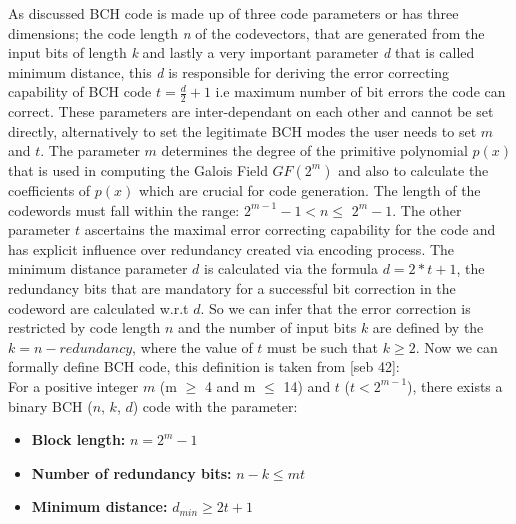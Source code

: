 As discussed BCH code is made up of three code parameters or has three dimensions; the code length \emph{n} of the codevectors, that are generated from the input bits of length \emph{k} and lastly a very important parameter \emph{d} that is called minimum distance, this \emph{d} is responsible for deriving the error correcting capability of BCH code $t = \frac{d}{2} + 1$ i.e maximum number of bit errors the code can correct. These parameters are inter-dependant on each other
and cannot be set directly, alternatively to set the legitimate BCH modes the user needs to set $m$ and $t$. The parameter $m$ determines the degree of the primitive polynomial $p(x)$ that is used in computing the Galois Field $GF(2^m)$ and also to calculate the coefficients of $p(x)$ which are crucial for code generation. The length of the codewords must fall within the range: $2^{m-1} - 1 < n \leq$ $2^m - 1$. The other parameter $t$ ascertains the maximal error correcting capability
for the code and has explicit influence over redundancy created via encoding process. The minimum distance parameter $d$ is calculated via the formula $d = 2 * t + 1$, the redundancy bits that are mandatory for a successful bit correction in the codeword are calculated w.r.t $d$. So we can infer that the error correction is restricted by code length $n$ and the number of input bits $k$ are defined by the $k = n - redundancy$, where the value of $t$ must be such that $k \geq 2$. Now we can
formally define BCH code, this definition is taken from [seb 42]:\\

For a positive integer $m$ (m $\geq$ 4 and m $\leq$ 14) and $t$ ($t < 2^{m-1}$), there exists a binary BCH ($n$, $k$, $d$) code with the parameter:
\begin{itemize}
\item \textbf{Block length:} $n = 2^m - 1$
\item \textbf{Number of redundancy bits:} $n - k \leq mt$
\item \textbf{Minimum distance:} $d_{min} \geq 2t + 1$
\end{itemize}

